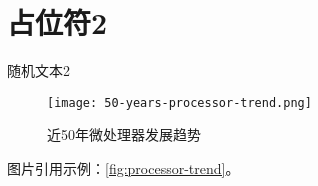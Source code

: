 





\ThesisSingleAppendix

\section{占位符2}

随机文本2

\begin{figure}[htb]
    \texttt{[image: 50-years-processor-trend.png]}
    \caption[处理器发展]{近50年微处理器发展趋势} %
    \label{fig:processor1}
\end{figure}

图片引用示例：\cref{fig:processor-trend}。

